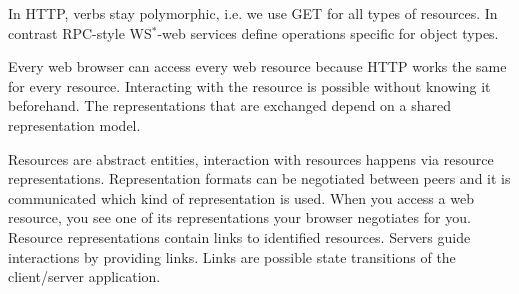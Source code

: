 \begin{myremark} In HTTP, verbs stay polymorphic, i.e. we use GET for all types of resources. In contrast RPC-style WS$^*$-web services define operations specific for object types.
\end{myremark}
\begin{mytitle}Every web browser can access every web resource because HTTP works the same for every resource. Interacting with the resource is possible without knowing it beforehand. The representations that are exchanged depend on a shared representation model.
\end{mytitle} 
\begin{mytitle} Resources are abstract entities, interaction with resources happens via resource representations. Representation formats can be negotiated between peers and it is communicated which kind of representation is used. When you access a web resource, you see one of its representations your browser negotiates for you. Resource representations contain links to identified resources. Servers guide interactions by providing links. Links are possible state transitions of the client/server application.
\end{mytitle}

